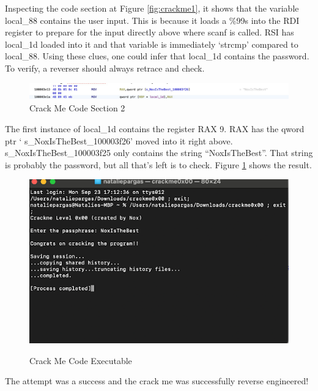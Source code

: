 Inspecting the code section at Figure \ref{fig:crackme1}, it shows that the variable local\_88 contains the user input. 
This is because it loads a \%99s into the RDI register to prepare for the input directly above where scanf is called. 
RSI has local\_1d loaded into it and that variable is immediately ‘strcmp’ compared to local\_88. Using these clues, one could infer that local\_1d contains the password. 
To verify, a reverser should always retrace and check.

\begin{figure}[H]
	\caption{Crack Me Code Section 2}
	\includegraphics[scale=.3]{crackmeRAX.png}
\end{figure}

The first instance of local\_1d contains the register RAX 9. 
RAX has the qword ptr ‘ s\_NoxIsTheBest\_100003f26’ moved into it right above. 
s\_NoxIsTheBest\_100003f25 only contains the string “NoxIsTheBest”. 
That string is probably the password, but all that’s left is to check. 
Figure \ref{fig:crackmeexe} shows the result.
\begin{figure}[H]
	\caption{Crack Me Code Executable}
	\includegraphics[scale=.6]{crackmeexe.png}
        \label{fig:crackmeexe}
\end{figure}
The attempt was a success and the crack me was successfully reverse engineered!

